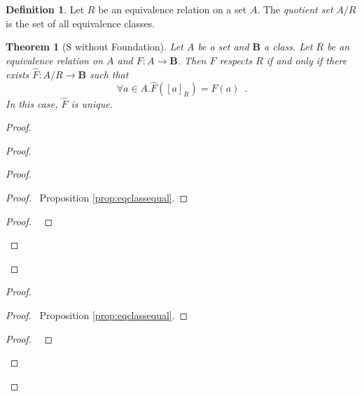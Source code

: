 \documentclass{book}
\let\qed\relax
\newtheorem{thm}[ax]{Theorem}
\theoremstyle{definition}
\newtheorem{df}[ax]{Definition}
\newcommand{\dom}{\ensuremath{\operatorname{dom}}}
\newcommand{\ran}{\ensuremath{\operatorname{ran}}}
\begin{document}
\begin{df}
Let $R$ be an equivalence relation on a set $A$. The \emph{quotient set} $A / R$ is the set of all equivalence classes.
\end{df}

\begin{thm}[S without Foundation]
Let $A$ be a set and $\mathbf{B}$ a class. Let $R$ be an equivalence relation on $A$ and $F : A \rightarrow \mathbf{B}$. Then $F$ respects $R$ if and only if there exists $\hat{F} : A/R \rightarrow \mathbf{B}$ such that
\[ \forall a \in A. \hat{F}([a]_R) = F(a) \enspace . \]
In this case, $\hat{F}$ is unique.
\end{thm}

\begin{proof}
\pf
{}
\begin{proof}
	\begin{proof}
		\begin{proof}
			\pf\ Proposition \ref{prop:eqclassequal}.
		\end{proof}
		\begin{proof}
			\pf\ 
		\end{proof}
	\end{proof}
	\step{d}{$\dom \hat{F} = A / R$}
	\step{e}{$\ran \hat{F} \subseteq \mathbf{B}$}
\end{proof}
\begin{proof}
		\begin{proof}
			\pf\ Proposition \ref{prop:eqclassequal}.
		\end{proof}
	\begin{proof}
		\pf\ 
	\end{proof}
\end{proof}
\qed
\end{proof}
\end{document}
